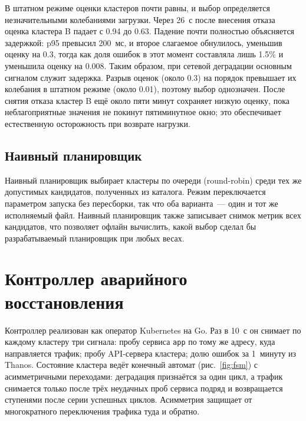 В штатном режиме оценки кластеров почти равны, и выбор определяется
незначительными колебаниями загрузки. Через 26~с после внесения отказа
оценка кластера B падает с 0.94 до 0.63. Падение почти полностью объясняется
задержкой: p95 превысил 200~мс, и второе слагаемое обнулилось, уменьшив
оценку на 0.3, тогда как доля ошибок в этот момент составляла лишь 1.5\% и
уменьшила оценку на 0.008. Таким образом, при сетевой деградации основным
сигналом служит задержка. Разрыв оценок (около 0.3) на порядок превышает их
колебания в штатном режиме (около 0.01), поэтому выбор однозначен. После
снятия отказа кластер B ещё около пяти минут сохраняет низкую оценку, пока
неблагоприятные значения не покинут пятиминутное окно; это обеспечивает
естественную осторожность при возврате нагрузки.

\subsection{Наивный планировщик}

Наивный планировщик выбирает кластеры по очереди (round-robin) среди тех же
допустимых кандидатов, полученных из каталога. Режим переключается
параметром запуска без пересборки, так что оба варианта~--- один и тот же
исполняемый файл. Наивный планировщик также записывает снимок метрик всех
кандидатов, что позволяет офлайн вычислить, какой выбор сделал бы
разрабатываемый планировщик при любых весах.

\section{Контроллер аварийного восстановления}

Контроллер реализован как оператор Kubernetes на Go. Раз в 10~с он снимает
по каждому кластеру три сигнала: пробу сервиса \texttt{app} по тому же
адресу, куда направляется трафик; пробу API-сервера кластера; долю ошибок за
1~минуту из Thanos. Состояние кластера ведёт конечный автомат
(рис.~\ref{fig:fsm}) с асимметричными переходами: деградация признаётся за
один цикл, а трафик снимается только после трёх неудачных проб сервиса
подряд и возвращается ступенями после серии успешных циклов. Асимметрия
защищает от многократного переключения трафика туда и обратно.


